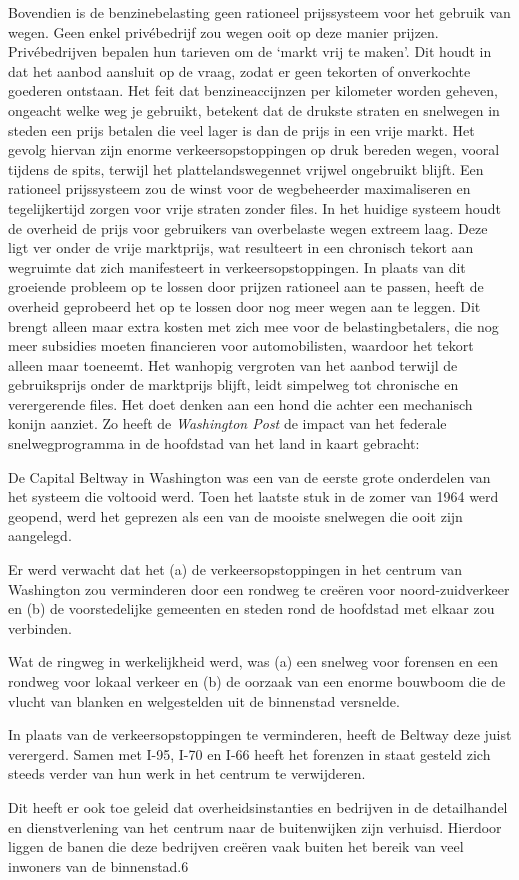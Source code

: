 \documentclass[
  a5paper,
  smalldemyvopaper,10pt,twoside,onecolumn,openright,extrafontsizes,hidelinks]{memoir}
\renewenvironment{quote}%
               {\list{}{\rightmargin=.6cm\leftmargin=.6cm}%
                \itshape \item[]}%
               {\endlist}
\begin{document}
Bovendien is de benzinebelasting geen rationeel prijssysteem voor het
gebruik van wegen. Geen enkel privébedrijf zou wegen ooit op deze manier
prijzen. Privébedrijven bepalen hun tarieven om de `markt vrij te
maken'. Dit houdt in dat het aanbod aansluit op de vraag, zodat er geen
tekorten of onverkochte goederen ontstaan. Het feit dat benzineaccijnzen
per kilometer worden geheven, ongeacht welke weg je gebruikt, betekent
dat de drukste straten en snelwegen in steden een prijs betalen die veel
lager is dan de prijs in een vrije markt. Het gevolg hiervan zijn enorme
verkeersopstoppingen op druk bereden wegen, vooral tijdens de spits,
terwijl het plattelandswegennet vrijwel ongebruikt blijft. Een rationeel
prijssysteem zou de winst voor de wegbeheerder maximaliseren en
tegelijkertijd zorgen voor vrije straten zonder files. In het huidige
systeem houdt de overheid de prijs voor gebruikers van overbelaste wegen
extreem laag. Deze ligt ver onder de vrije marktprijs, wat resulteert in
een chronisch tekort aan wegruimte dat zich manifesteert in
verkeersopstoppingen. In plaats van dit groeiende probleem op te lossen
door prijzen rationeel aan te passen, heeft de overheid geprobeerd het
op te lossen door nog meer wegen aan te leggen. Dit brengt alleen maar
extra kosten met zich mee voor de belastingbetalers, die nog meer
subsidies moeten financieren voor automobilisten, waardoor het tekort
alleen maar toeneemt. Het wanhopig vergroten van het aanbod terwijl de
gebruiksprijs onder de marktprijs blijft, leidt simpelweg tot chronische
en verergerende files. Het doet denken aan een hond die achter een
mechanisch konijn aanziet. Zo heeft de \emph{Washington Post} de impact
van het federale snelwegprogramma in de hoofdstad van het land in kaart
gebracht:

\begin{quote}
De Capital Beltway in Washington was een van de eerste grote onderdelen
van het systeem die voltooid werd. Toen het laatste stuk in de zomer van
1964 werd geopend, werd het geprezen als een van de mooiste snelwegen
die ooit zijn aangelegd.

Er werd verwacht dat het (a) de verkeersopstoppingen in het centrum van
Washington zou verminderen door een rondweg te creëren voor
noord-zuidverkeer en (b) de voorstedelijke gemeenten en steden rond de
hoofdstad met elkaar zou verbinden.

Wat de ringweg in werkelijkheid werd, was (a) een snelweg voor forensen
en een rondweg voor lokaal verkeer en (b) de oorzaak van een enorme
bouwboom die de vlucht van blanken en welgestelden uit de binnenstad
versnelde.

In plaats van de verkeersopstoppingen te verminderen, heeft de Beltway
deze juist verergerd. Samen met I-95, I-70 en I-66 heeft het forenzen in
staat gesteld zich steeds verder van hun werk in het centrum te
verwijderen.

Dit heeft er ook toe geleid dat overheidsinstanties en bedrijven in de
detailhandel en dienstverlening van het centrum naar de buitenwijken
zijn verhuisd. Hierdoor liggen de banen die deze bedrijven creëren vaak
buiten het bereik van veel inwoners van de binnenstad.6
\end{quote}
\end{document}
